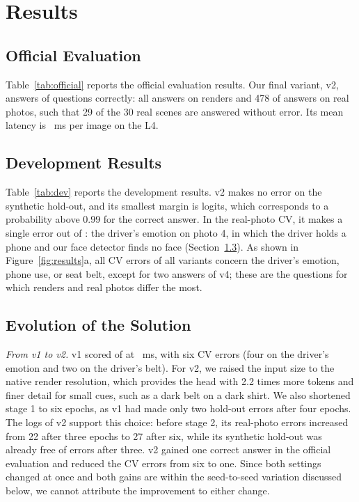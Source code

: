 \documentclass[10pt,conference]{IEEEtran}
\begin{document}


\section{Results}\label{sec:results}
\subsection{Official Evaluation}
Table~\ref{tab:official} reports the official evaluation results. Our final variant, v2, answers \vTwoCorrect{} of \nAll{} questions correctly: all \nSyn{} answers on renders and 478 of \nReal{} answers on real photos, such that 29 of the 30 real scenes are answered without error. Its mean latency is \vTwoLat{}~ms per image on the L4.



\subsection{Development Results}
Table~\ref{tab:dev} reports the development results. v2 makes no error on the synthetic hold-out, and its smallest margin is \vTwoMinMargin{} logits, which corresponds to a probability above 0.99 for the correct answer. In the real-photo CV, it makes a single error out of \nCvAns{}: the driver's emotion on photo 4, in which the driver holds a phone and our face detector finds no face (Section~\ref{sec:evolution}). As shown in Figure~\ref{fig:results}a, all CV errors of all variants concern the driver's emotion, phone use, or seat belt, except for two answers of v4; these are the questions for which renders and real photos differ the most.

\subsection{Evolution of the Solution}\label{sec:evolution}
\emph{From v1 to v2.} v1 scored \vOneCorrect{} of \nAll{} at \vOneLat{}~ms, with six CV errors (four on the driver's emotion and two on the driver's belt). For v2, we raised the input size to the native render resolution, which provides the head with 2.2 times more tokens and finer detail for small cues, such as a dark belt on a dark shirt. We also shortened stage 1 to six epochs, as v1 had made only two hold-out errors after four epochs. The logs of v2 support this choice: before stage 2, its real-photo errors increased from 22 after three epochs to 27 after six, while its synthetic hold-out was already free of errors after three. v2 gained one correct answer in the official evaluation and reduced the CV errors from six to one. Since both settings changed at once and both gains are within the seed-to-seed variation discussed below, we cannot attribute the improvement to either change.
\end{document}
